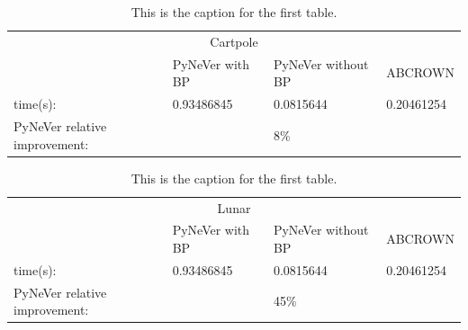 \begin{table}[]
    \centering
    \begin{tabular}{@{}llll@{}}
        \toprule
        \multicolumn{4}{c}{Cartpole}  \\
        \cmidrule(r){1-4}
                                            & PyNeVer with BP                        & PyNeVer without BP               & ABCROWN                           \\ \cmidrule(r){1-4}
    time(s):                                & {\color[HTML]{ACB9CA} 0.93486845}      & {\color[HTML]{ACB9CA} 0.0815644} & {\color[HTML]{ACB9CA} 0.20461254} \\ \cmidrule(r){1-4}
    PyNeVer relative improvement:           &                                        & {\color[HTML]{FF0000} 8\%}       &                                   \\ \cmidrule(r){1-4}
    \end{tabular}
    \caption{This is the caption for the first table.}
    \label{table:CARTPOLE}
\end{table}

\begin{table}[]
    \centering
    \begin{tabular}{@{}llll@{}}
        \toprule
        \multicolumn{4}{c}{Lunar}  \\
        \cmidrule(r){1-4}
                                             & PyNeVer with BP & PyNeVer without BP                & ABCROWN                           \\ \cmidrule(r){1-4}
    time(s):                                 & {\color[HTML]{ACB9CA} 0.93486845}                   & {\color[HTML]{ACB9CA} 0.0815644}  & {\color[HTML]{ACB9CA} 0.20461254} \\ \cmidrule(r){1-4}
    PyNeVer relative improvement:            &                                                     & {\color[HTML]{FF0000} 45\%}       &                                   \\ \cmidrule(r){1-4}
    \end{tabular}
    \caption{This is the caption for the first table.}
    \label{table:LUNAR}
\end{table}

